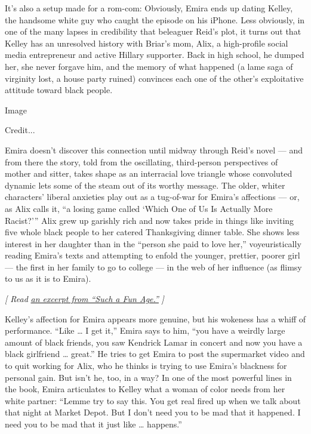 It's also a setup made for a rom-com: Obviously, Emira ends up dating
Kelley, the handsome white guy who caught the episode on his iPhone.
Less obviously, in one of the many lapses in credibility that beleaguer
Reid's plot, it turns out that Kelley has an unresolved history with
Briar's mom, Alix, a high-profile social media entrepreneur and active
Hillary supporter. Back in high school, he dumped her, she never forgave
him, and the memory of what happened (a lame saga of virginity lost, a
house party ruined) convinces each one of the other's exploitative
attitude toward black people.

Image

Credit...

Emira doesn't discover this connection until midway through Reid's novel
--- and from there the story, told from the oscillating, third-person
perspectives of mother and sitter, takes shape as an interracial love
triangle whose convoluted dynamic lets some of the steam out of its
worthy message. The older, whiter characters' liberal anxieties play out
as a tug-of-war for Emira's affections --- or, as Alix calls it, ``a
losing game called `Which One of Us Is Actually More Racist?''' Alix
grew up garishly rich and now takes pride in things like inviting five
whole black people to her catered Thanksgiving dinner table. She shows
less interest in her daughter than in the ``person she paid to love
her,'' voyeuristically reading Emira's texts and attempting to enfold
the younger, prettier, poorer girl --- the first in her family to go to
college --- in the web of her influence (as flimsy to us as it is to
Emira).

\emph{{[} Read}
\href{https://www.nytimes.com/2019/12/31/books/review/such-a-fun-age-by-kiley-reid-an-excerpt.html}{\emph{an
excerpt from ``Such a Fun Age.''}} \emph{{]}}

Kelley's affection for Emira appears more genuine, but his wokeness has
a whiff of performance. ``Like \ldots{} I get it,'' Emira says to him,
``you have a weirdly large amount of black friends, you saw Kendrick
Lamar in concert and now you have a black girlfriend \ldots{} great.''
He tries to get Emira to post the supermarket video and to quit working
for Alix, who he thinks is trying to use Emira's blackness for personal
gain. But isn't he, too, in a way? In one of the most powerful lines in
the book, Emira articulates to Kelley what a woman of color needs from
her white partner: ``Lemme try to say this. You get real fired up when
we talk about that night at Market Depot. But I don't need you to be mad
that it happened. I need you to be mad that it just like \ldots{}
happens.''

